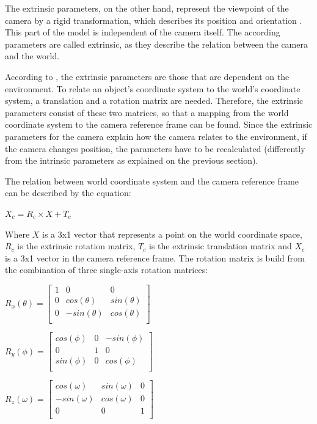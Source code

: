 \documentclass[msc, a4paper, classic, en]{ufbathesis}
\begin{document}
The extrinsic parameters, on the other hand, represent the viewpoint of the camera by a rigid transformation, which describes its position and orientation \cite{bajramovic2010self}. This part of the model is independent of the camera itself. The according parameters are called extrinsic, as they describe the relation between the camera and the world.

According to \cite{tillapaugh2008indirect}, the extrinsic parameters are those that are dependent on the environment. To relate an object's coordinate system to the world's coordinate system, a translation and a rotation matrix are needed. Therefore, the extrinsic parameters consist of these two matrices, so that a mapping from the world coordinate system to the camera reference frame can be found. Since the extrinsic parameters for the camera explain how the camera relates to the environment, if the camera changes position, the parameters have to be recalculated (differently from the intrinsic parameters as explained on the previous section).

The relation between world coordinate system and the camera reference frame can be described by the equation:

\begin{center}
$X_c = R_c \times X + T_c$
\end{center}

Where $X$ is a 3x1 vector that represents a point on the world coordinate space, $R_c$ is the extrinsic rotation matrix, $T_c$ is the extrinsic translation matrix and $X_c$ is a 3x1 vector in the camera reference frame. The rotation matrix is build from the combination of three single-axis rotation matrices:

\begin{center}

$R_{x}(\theta) =
\begin{bmatrix}
1 & 0 & 0 \\
0 & cos(\theta) & sin(\theta) \\
0 & -sin(\theta) & cos(\theta) \\
\end{bmatrix}$

\vspace{10mm}

$R_{y}(\phi) =
\begin{bmatrix}
cos(\phi) & 0 & -sin(\phi) \\
0 & 1 & 0 \\
sin(\phi) & 0 & cos(\phi) \\
\end{bmatrix}$

\vspace{10mm}

$R_{z}(\omega) =
\begin{bmatrix}
cos(\omega) & sin(\omega) & 0 \\
-sin(\omega) & cos(\omega) & 0 \\
0 & 0 & 1 \\
\end{bmatrix}$

\end{center}
\end{document}
